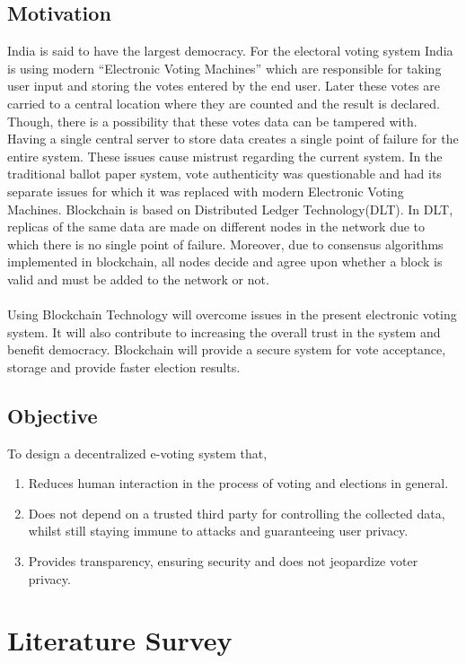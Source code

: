 \documentclass[oneside, 12pt]{book}
\begin{document}
		\subsection{Motivation}
			India is said to have the largest democracy. For the electoral voting system India is using modern “Electronic Voting Machines” which are responsible for taking user input and storing the votes entered by the end user. Later these votes are carried to a central location where they are counted and the result is declared. Though, there is a possibility that these votes data can be tampered with. Having a single central server to store data creates a single point of failure for the entire system. These issues cause mistrust regarding the current system. In the traditional ballot paper system, vote authenticity was questionable and had its separate issues for which it was replaced with modern Electronic Voting Machines. Blockchain is based on Distributed Ledger Technology(DLT). In DLT, replicas of the same data are made on different nodes in the network due to which there is no single point of failure. Moreover, due to consensus algorithms implemented in blockchain, all nodes decide and agree upon whether a block is valid and must be added to the network or not.
			\\\\Using Blockchain Technology will overcome issues in the present electronic voting system. It will also contribute to increasing the overall trust in the system and benefit democracy. Blockchain will provide a secure system for vote acceptance, storage and provide faster election results.
		\subsection{Objective}
			To design a decentralized e-voting system that,
			\begin{enumerate}
				\item Reduces human interaction in the process of voting and elections in general. 
				\item Does not depend on a trusted third party for controlling the collected data, whilst still staying immune to attacks and guaranteeing user privacy.
				\item Provides transparency, ensuring security and does not jeopardize voter privacy.
			\end{enumerate}
	\newpage
	\section{Literature Survey}
	\newpage
\end{document}
